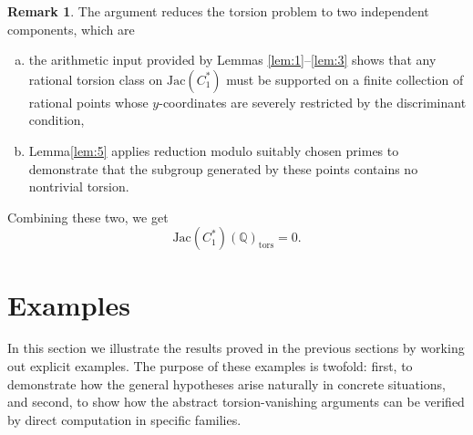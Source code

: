 \documentclass[12pt, reqno]{amsart}
\numberwithin{equation}{section}
\theoremstyle{definition}
\newtheorem{remark}[thm]{Remark}
\theoremstyle{nodefstyle}
\begin{document}
\begin{remark}
The argument reduces the torsion problem to two independent components, which are
\begin{enumerate}[a)]
\item the arithmetic input provided by Lemmas \autoref{lem:1}--\autoref{lem:3} shows that any rational torsion class on \(\mathrm{Jac}(C_1^*)\) must be supported on a finite collection of rational points whose \(y\)-coordinates are severely restricted by the discriminant condition,
\item Lemma\autoref{lem:5} applies reduction modulo suitably chosen primes to demonstrate that the subgroup generated by these points contains no nontrivial torsion.
\end{enumerate}
Combining these two, we get 
\[
\mathrm{Jac}(C_1^*)(\mathbb{Q})_{\mathrm{tors}} = 0.
\]
\end{remark}

\section{Examples} \label{sec:ex}
In this section we illustrate the results proved in the previous sections by working out explicit examples. The purpose of these examples is twofold: first, to demonstrate how the general hypotheses arise naturally in concrete situations, and second, to show how the abstract torsion-vanishing arguments can be verified by direct computation in
specific families.
\end{document}
